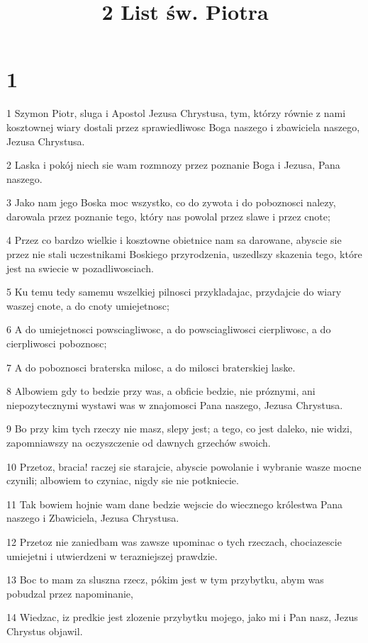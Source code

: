 

\title{2 List św. Piotra}


\chapter{1}

\par 1 Szymon Piotr, sluga i Apostol Jezusa Chrystusa, tym, którzy równie z nami kosztownej wiary dostali przez sprawiedliwosc Boga naszego i zbawiciela naszego, Jezusa Chrystusa.
\par 2 Laska i pokój niech sie wam rozmnozy przez poznanie Boga i Jezusa, Pana naszego.
\par 3 Jako nam jego Boska moc wszystko, co do zywota i do poboznosci nalezy, darowala przez poznanie tego, który nas powolal przez slawe i przez cnote;
\par 4 Przez co bardzo wielkie i kosztowne obietnice nam sa darowane, abyscie sie przez nie stali uczestnikami Boskiego przyrodzenia, uszedlszy skazenia tego, które jest na swiecie w pozadliwosciach.
\par 5 Ku temu tedy samemu wszelkiej pilnosci przykladajac, przydajcie do wiary waszej cnote, a do cnoty umiejetnosc;
\par 6 A do umiejetnosci powsciagliwosc, a do powsciagliwosci cierpliwosc, a do cierpliwosci poboznosc;
\par 7 A do poboznosci braterska milosc, a do milosci braterskiej laske.
\par 8 Albowiem gdy to bedzie przy was, a obficie bedzie, nie próznymi, ani niepozytecznymi wystawi was w znajomosci Pana naszego, Jezusa Chrystusa.
\par 9 Bo przy kim tych rzeczy nie masz, slepy jest; a tego, co jest daleko, nie widzi, zapomniawszy na oczyszczenie od dawnych grzechów swoich.
\par 10 Przetoz, bracia! raczej sie starajcie, abyscie powolanie i wybranie wasze mocne czynili; albowiem to czyniac, nigdy sie nie potkniecie.
\par 11 Tak bowiem hojnie wam dane bedzie wejscie do wiecznego królestwa Pana naszego i Zbawiciela, Jezusa Chrystusa.
\par 12 Przetoz nie zaniedbam was zawsze upominac o tych rzeczach, chociazescie umiejetni i utwierdzeni w terazniejszej prawdzie.
\par 13 Boc to mam za sluszna rzecz, pókim jest w tym przybytku, abym was pobudzal przez napominanie,
\par 14 Wiedzac, iz predkie jest zlozenie przybytku mojego, jako mi i Pan nasz, Jezus Chrystus objawil.

